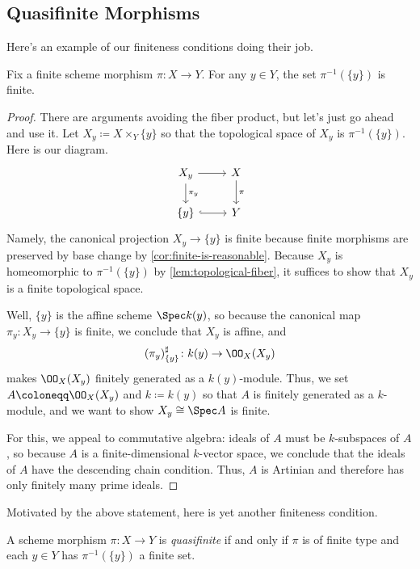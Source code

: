 \documentclass[../notes.tex]{subfiles}
\begin{document}
\subsection{Quasifinite Morphisms}
Here's an example of our finiteness conditions doing their job.
\begin{lemma} \label{lem:finite-is-qf}
	Fix a finite scheme morphism $\pi\colon X\to Y$. For any $y\in Y$, the set $\pi^{-1}(\{y\})$ is finite.
\end{lemma}
\begin{proof}
	There are arguments avoiding the fiber product, but let's just go ahead and use it. Let $X_y\coloneqq X\times_Y\{y\}$ so that the topological space of $X_y$ is $\pi^{-1}(\{y\})$. Here is our diagram.
	\[\begin{tikzcd}
		{X_y} & X \\
		{\{y\}} & Y
		\arrow[from=1-1, to=1-2]
		\arrow["\pi", from=1-2, to=2-2]
		\arrow[hook, from=2-1, to=2-2]
		\arrow["{\pi_y}", from=1-1, to=2-1]
	\end{tikzcd}\]
	Namely, the canonical projection $X_y\to\{y\}$ is finite because finite morphisms are preserved by base change by \autoref{cor:finite-is-reasonable}. Because $X_y$ is homeomorphic to $\pi^{-1}(\{y\})$ by \autoref{lem:topological-fiber}, it suffices to show that $X_y$ is a finite topological space.

	Well, $\{y\}$ is the affine scheme $\Spec k(y)$, so because the canonical map $\pi_y\colon X_y\to\{y\}$ is finite, we conclude that $X_y$ is affine, and
	\[(\pi_y)^\sharp_{\{y\}}\colon k(y)\to\OO_X(X_y)\]
	makes $\OO_X(X_y)$ finitely generated as a $k(y)$-module. Thus, we set $A\coloneqq\OO_X(X_y)$ and $k\coloneqq k(y)$ so that $A$ is finitely generated as a $k$-module, and we want to show $X_y\cong\Spec A$ is finite.

	For this, we appeal to commutative algebra: ideals of $A$ must be $k$-subspaces of $A$, so because $A$ is a finite-dimensional $k$-vector space, we conclude that the ideals of $A$ have the descending chain condition. Thus, $A$ is Artinian and therefore has only finitely many prime ideals.
\end{proof}
Motivated by the above statement, here is yet another finiteness condition.
\begin{definition}[Quasifinite]
	A scheme morphism $\pi\colon X\to Y$ is \textit{quasifinite} if and only if $\pi$ is of finite type and each $y\in Y$ has $\pi^{-1}(\{y\})$ a finite set.
\end{definition}
\end{document}
